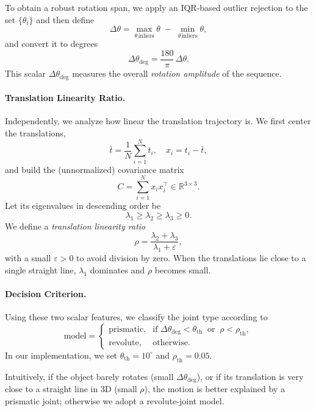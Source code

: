 To obtain a robust rotation span, we apply an IQR-based outlier
rejection to the set $\{\theta_i\}$ and then define
\[
\Delta\theta = 
\max_{\theta \,\text{inliers}} \theta \;-\;
\min_{\theta \,\text{inliers}} \theta,
\]
and convert it to degrees
\[
\Delta\theta_{\mathrm{deg}} = \frac{180}{\pi}\,\Delta\theta.
\]
This scalar $\Delta\theta_{\mathrm{deg}}$ measures the overall
\textit{rotation amplitude} of the sequence.

\paragraph{Translation Linearity Ratio.}
Independently, we analyze how linear the translation trajectory is.
We first center the translations,
\[
\bar{t} = \frac{1}{N}\sum_{i=1}^N t_i, \quad
x_i = t_i - \bar{t},
\]
and build the (unnormalized) covariance matrix
\[
C = \sum_{i=1}^N x_i x_i^\top \in \mathbb{R}^{3\times 3}.
\]
Let its eigenvalues in descending order be
\[
\lambda_1 \ge \lambda_2 \ge \lambda_3 \ge 0.
\]
We define a \emph{translation linearity ratio}
\[
\rho = \frac{\lambda_2 + \lambda_3}{\lambda_1 + \varepsilon},
\]
with a small $\varepsilon > 0$ to avoid division by zero.
When the translations lie close to a single straight line, $\lambda_1$
dominates and $\rho$ becomes small.

\paragraph{Decision Criterion.}
Using these two scalar features, we classify the joint type according to
\[
\text{model} =
\begin{cases}
\text{prismatic}, 
& \text{if } \Delta\theta_{\mathrm{deg}} < \theta_{\mathrm{th}}
\;\; \text{or} \;\; \rho < \rho_{\mathrm{th}},\\[4pt]
\text{revolute},
& \text{otherwise}.
\end{cases}
\]
In our implementation, we set
\(
\theta_{\mathrm{th}} = 10^\circ
\)
and
\(
\rho_{\mathrm{th}} = 0.05.
\)

Intuitively, if the object barely rotates (small
$\Delta\theta_{\mathrm{deg}}$), or if its translation is very close
to a straight line in 3D (small $\rho$), the motion is better
explained by a prismatic joint; otherwise we adopt a revolute-joint
model.

